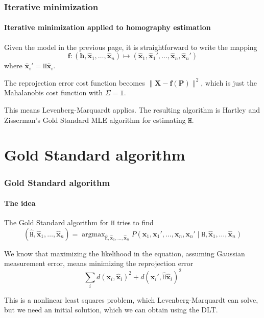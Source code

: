 \documentclass[aspectratio=169]{beamer}
\renewcommand{\vec}[1]{\boldsymbol{#1}}
\newcommand{\mat}[1]{\mathtt{#1}}
\DeclareMathOperator*{\argmax}{argmax}
\begin{document}
\begin{frame}
\frametitle{Iterative minimization}
\framesubtitle{Iterative minimization applied to homography estimation}

Given the model in the previous page, it is straightforward to write
the mapping
\begin{equation*}
  \vec{f} : (\vec{h},\hat{\vec{x}}_1,\ldots,\hat{\vec{x}}_n) \mapsto
  (\hat{\vec{x}}_1,\hat{\vec{x}}_1',\ldots,\hat{\vec{x}}_n,\hat{\vec{x}}_n')
\end{equation*}
where $\hat{\vec{x}}_i' = \mat{H}\hat{\vec{x}}_i$.

\medskip

The reprojection error cost function becomes
$\|\vec{X}-\vec{f}(\vec{P})\|^2$, which is just the Mahalanobis cost
function with $\mat{\Sigma}=\mat{I}$.

\medskip

This means Levenberg-Marquardt applies.  The resulting algorithm is
Hartley and Zisserman's \alert{Gold Standard} MLE algorithm for
estimating $\mat{H}$.

\end{frame}

\section{Gold Standard algorithm}

\begin{frame}
\frametitle{Gold Standard algorithm}
\framesubtitle{The idea}

The \alert{Gold Standard algorithm} for $\mat{H}$ tries to find
\begin{equation*}
(\hat{\mat{H}},\hat{\vec{x}}_1,\ldots,\hat{\vec{x}}_n) =
\argmax_{\hat{\mat{H}},\hat{\vec{x}}_1,\ldots,\hat{\vec{x}}_n}
P(\vec{x}_1,\vec{x}_1',\ldots,\vec{x}_n,\vec{x}_n' \mid
\mat{H},\hat{\vec{x}}_1,\ldots,\hat{\vec{x}}_n)
\end{equation*}

\medskip

We know that maximizing the likelihood in the equation, assuming
Gaussian measurement error, means minimizing the reprojection error
\begin{equation*}
\sum_i d(\vec{x}_i, \hat{\vec{x}}_i)^2 +
       d(\vec{x}_i', \hat{\mat{H}}\hat{\vec{x}}_i)^2
\end{equation*}

\medskip

This is a nonlinear least squares problem, which Levenberg-Marquardt
can solve, but we need an \alert{initial solution}, which we can
obtain using the DLT.

\end{frame}
\end{document}
